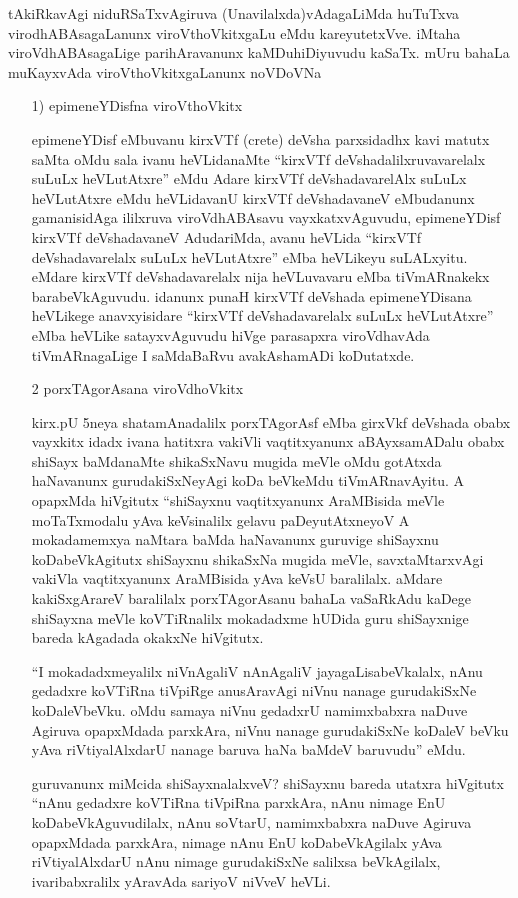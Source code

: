 tAkiRkavAgi niduRSaTxvAgiruva (Unavilalxda)vAdagaLiMda huTuTxva virodhABAsagaLanunx viroVthoVkitxgaLu eMdu kareyutetxVve. iMtaha viroVdhABAsagaLige parihAravanunx kaMDuhiDiyuvudu kaSaTx. mUru bahaLa muKayxvAda viroVthoVkitxgaLanunx noVDoVNa
\begin{itemize}
\item[{\rm 1)}] epimeneYDisfna viroVthoVkitx

epimeneYDisf eMbuvanu kirxVTf {\rm (crete)} deVsha parxsidadhx kavi matutx saMta oMdu sala ivanu heVLidanaMte ``kirxVTf deVshadalilxruvavarelalx suLuLx heVLutAtxre'' eMdu Adare kirxVTf deVshadavarelAlx suLuLx heVLutAtxre eMdu heVLidavanU kirxVTf deVshadavaneV eMbudanunx gamanisidAga ililxruva viroVdhABAsavu vayxkatxvAguvudu, epimeneYDisf kirxVTf deVshadavaneV AdudariMda, avanu heVLida ``kirxVTf deVshadavarelalx suLuLx heVLutAtxre'' eMba heVLikeyu suLALxyitu. eMdare kirxVTf deVshadavarelalx nija heVLuvavaru eMba tiVmARnakekx barabeVkAguvudu. idanunx punaH kirxVTf deVshada epimeneYDisana heVLikege anavxyisidare ``kirxVTf deVshadavarelalx suLuLx heVLutAtxre'' eMba heVLike satayxvAguvudu hiVge parasapxra viroVdhavAda tiVmARnagaLige I saMdaBaRvu avakAshamADi koDutatxde.
\item[{\rm 2}] porxTAgorAsana viroVdhoVkitx

kirx.pU {\rm 5}neya shatamAnadalilx porxTAgorAsf eMba girxVkf deVshada obabx vayxkitx idadx ivana hatitxra vakiVli vaqtitxyanunx aBAyxsamADalu obabx shiSayx baMdanaMte shikaSxNavu mugida meVle oMdu gotAtxda haNavanunx gurudakiSxNeyAgi koDa beVkeMdu tiVmARnavAyitu. A opapxMda hiVgitutx ``shiSayxnu vaqtitxyanunx AraMBisida meVle moTaTxmodalu yAva keVsinalilx gelavu paDeyutAtxneyoV A mokadamemxya naMtara baMda haNavanunx guruvige shiSayxnu koDabeVkAgitutx shiSayxnu shikaSxNa mugida meVle, savxtaMtarxvAgi vakiVla vaqtitxyanunx AraMBisida yAva keVsU baralilalx. aMdare kakiSxgArareV baralilalx porxTAgorAsanu bahaLa vaSaRkAdu kaDege shiSayxna meVle koVTiRnalilx mokadadxme hUDida guru shiSayxnige bareda kAgadada okakxNe hiVgitutx.

``I mokadadxmeyalilx niVnAgaliV nAnAgaliV jayagaLisabeVkalalx, nAnu gedadxre koVTiRna tiVpiRge anusAravAgi niVnu nanage gurudakiSxNe koDaleVbeVku. oMdu samaya niVnu gedadxrU namimxbabxra naDuve Agiruva opapxMdada parxkAra, niVnu nanage gurudakiSxNe koDaleV beVku yAva riVtiyalAlxdarU nanage baruva haNa baMdeV baruvudu'' eMdu.

guruvanunx miMcida shiSayxnalalxveV? shiSayxnu bareda utatxra hiVgitutx ``nAnu gedadxre koVTiRna tiVpiRna parxkAra, nAnu nimage EnU koDabeVkAguvudilalx, nAnu soVtarU, namimxbabxra naDuve Agiruva opapxMdada parxkAra, nimage nAnu EnU koDabeVkAgilalx yAva riVtiyalAlxdarU nAnu nimage gurudakiSxNe salilxsa beVkAgilalx, ivaribabxralilx yAravAda sariyoV niVveV heVLi.


\end{itemize}
